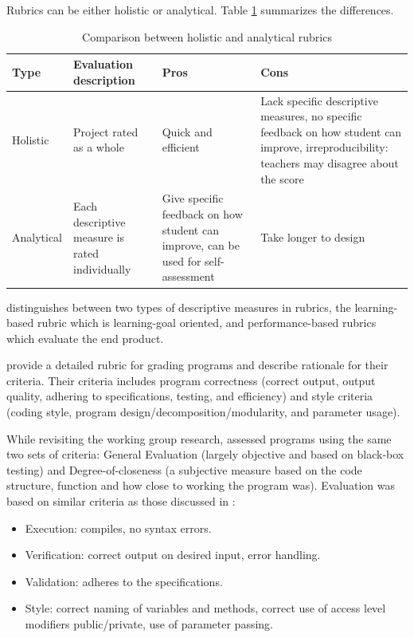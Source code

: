 Rubrics can be either holistic or analytical. Table \ref{table:RubricsHolisticAnalytical} summarizes the differences.

\begin{table}
  \centering
\begin{tabular}{|l||p{20mm}|p{55mm}|p{65mm}|}
  \hline
  \textbf{Type} & \textbf{Evaluation description} & \textbf{Pros} & \textbf{Cons} \\
  \hline
  Holistic & Project rated as a whole & Quick and efficient & Lack specific descriptive measures, no specific feedback on how student can improve, irreproducibility: teachers may disagree about the score \cite{catete2017framework} \\ \hline
  Analytical & Each descriptive measure is rated individually & Give specific feedback on how student can improve, can be used for self-assessment & Take longer to design \\
  \hline
\end{tabular}
\caption{Comparison between holistic and analytical rubrics}\label{table:RubricsHolisticAnalytical}
\end{table}

 distinguishes between two types of descriptive measures in rubrics, the learning-based rubric which is learning-goal oriented, and performance-based rubrics which evaluate the end product.



 provide a detailed rubric for grading programs and describe rationale for their criteria. Their criteria includes
program correctness (correct output, output quality, adhering to specifications, testing, and efficiency) and style criteria (coding
style, program design/decomposition/modularity, and parameter usage).


While revisiting the \citeauthor{McCracken2001} working group research,  assessed programs using the same two sets of criteria: General Evaluation (largely objective and based on black-box testing) and Degree-of-closeness (a subjective measure based on the code structure, function and how close to working the program was). Evaluation was based on similar criteria as those discussed in \cite{smith2005rubricsCriteria}:
\begin{itemize}
\item Execution: compiles, no syntax errors.
\item Verification: correct output on desired input, error handling.
\item Validation: adheres to the specifications.
\item Style: correct naming of variables and methods, correct use of access level modifiers public/private, use of parameter passing.
\end{itemize}




